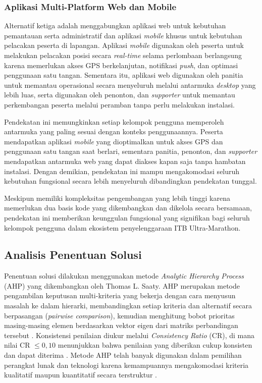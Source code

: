 \subsubsection{Aplikasi Multi-Platform Web dan Mobile}

Alternatif ketiga adalah menggabungkan aplikasi web untuk kebutuhan pemantauan serta administratif dan aplikasi \textit{mobile} khusus untuk kebutuhan pelacakan peserta di lapangan. Aplikasi \textit{mobile} digunakan oleh peserta untuk melakukan pelacakan posisi secara \textit{real-time} selama perlombaan berlangsung karena memerlukan akses GPS berkelanjutan, notifikasi \textit{push}, dan optimasi penggunaan satu tangan. Sementara itu, aplikasi web digunakan oleh panitia untuk memantau operasional secara menyeluruh melalui antarmuka \textit{desktop} yang lebih luas, serta digunakan oleh penonton, dan \textit{supporter} untuk memantau perkembangan peserta melalui peramban tanpa perlu melakukan instalasi.

Pendekatan ini memungkinkan setiap kelompok pengguna memperoleh antarmuka yang paling sesuai dengan konteks penggunaannya. Peserta mendapatkan aplikasi \textit{mobile} yang dioptimalkan untuk akses GPS dan penggunaan satu tangan saat berlari, sementara panitia, penonton, dan \textit{supporter} mendapatkan antarmuka web yang dapat diakses kapan saja tanpa hambatan instalasi. Dengan demikian, pendekatan ini mampu mengakomodasi seluruh kebutuhan fungsional secara lebih menyeluruh dibandingkan pendekatan tunggal.

Meskipun memiliki kompleksitas pengembangan yang lebih tinggi karena memerlukan dua basis kode yang dikembangkan dan dikelola secara bersamaan, pendekatan ini memberikan keunggulan fungsional yang signifikan bagi seluruh kelompok pengguna dalam ekosistem penyelenggaraan ITB Ultra-Marathon.

\subsection{Analisis Penentuan Solusi}
Penentuan solusi dilakukan menggunakan metode \textit{Analytic Hierarchy Process} (AHP) yang dikembangkan oleh Thomas L. Saaty. AHP merupakan metode pengambilan keputusan multi-kriteria yang bekerja dengan cara menyusun masalah ke dalam hierarki, membandingkan setiap kriteria dan alternatif secara berpasangan (\textit{pairwise comparison}), kemudian menghitung bobot prioritas masing-masing elemen berdasarkan vektor eigen dari matriks perbandingan tersebut \cite{Saaty1980}. Konsistensi penilaian diukur melalui \textit{Consistency Ratio} (CR), di mana nilai CR $\leq 0{,}10$ menunjukkan bahwa penilaian yang diberikan cukup konsisten dan dapat diterima \cite{Saaty1980}. Metode AHP telah banyak digunakan dalam pemilihan perangkat lunak dan teknologi karena kemampuannya mengakomodasi kriteria kualitatif maupun kuantitatif secara terstruktur \cite{Vaidya2006}.

